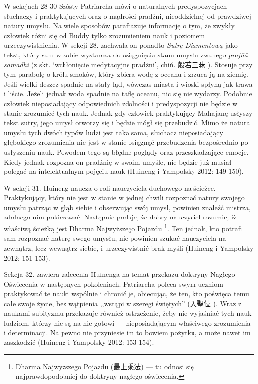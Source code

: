 W sekcjach 28-30 Szósty Patriarcha mówi o naturalnych predyspozycjach słuchaczy i praktykujących oraz o mądrości pradżni, nieoddzielnej od prawdziwej natury umysłu.
Na wiele sposobów parafrazuje informację o tym, że zwykły człowiek różni się od Buddy tylko zrozumieniem nauk i poziomem urzeczywistnienia.
W sekcji 28. zachwala on ponadto \textit{Sutrę Diamentową} jako tekst, który sam w sobie wystarcza do osiągnięcia stanu umysłu zwanego \textit{prajñā samādhi} (z skt. `wchłonięcie medytacyjne pradżni', chiń. 般若三昧 ).
Stosuje przy tym parabolę o królu smoków, który zbiera wodę z oceanu i zrzuca ją na ziemię.
Jeśli wielki deszcz spadnie na stały ląd, wówczas miasta i wioski spłyną jak trawa i liście.
Jeżeli jednak woda spadnie na taflę oceanu, nic się nie wydarzy.
Podobnie człowiek nieposiadający odpowiednich zdolności i predyspozycji nie będzie w stanie zrozumieć tych nauk.
Jednak gdy człowiek praktykujący Mahajanę usłyszy tekst sutry, jego umysł otworzy się i będzie mógł się przebudzić.
Mimo że natura umysłu tych dwóch typów ludzi jest taka sama, słuchacz nieposiadający głębokiego zrozumienia nie jest w stanie osiągnąć przebudzenia bezpośrednio po usłyszeniu nauk.
Powodem tego są błędne poglądy oraz przeszkadzające emocje.
Kiedy jednak rozpozna on pradżnię w swoim umyśle, nie będzie już musiał polegać na intelektualnym pojęciu nauk
(Huineng i Yampolsky 2012: 149-150).

W sekcji 31. Huineng naucza o roli nauczyciela duchowego na ścieżce.
Praktykujący, który nie jest w stanie w jednej chwili rozpoznać natury swojego umysłu patrząc w głąb siebie i obserwując swój umysł, powinien znaleźć mistrza, zdolnego nim pokierować.
Następnie podaje, że dobry nauczyciel rozumie, iż właściwą ścieżką jest Dharma Najwyższego Pojazdu%
\footnote{Dharma Najwyższego Pojazdu (最上乘法) --- tu odnosi się najprawdopodobniej do doktryny nagłego oświecenia.}.%
Ten jednak, kto potrafi sam rozpoznać naturę swego umysłu, nie powinien szukać nauczyciela na zewnątrz, lecz wewnątrz siebie, i urzeczywistnić brak myśli
(Huineng i Yampolsky 2012: 151-153).

Sekcja 32. zawiera zalecenia Huinenga na temat przekazu doktryny Nagłego Oświecenia w następnych pokoleniach.
Patriarcha poleca swym uczniom praktykować te nauki wspólnie i chronić je, obiecując, że ten, kto poświęca temu całe swoje życie, bez wątpienia ,,wstąpi w szeregi świętych'' (入聖位 ).
Wraz z naukami subityzmu przekazuje również ostrzeżenie, żeby nie wyjaśniać tych nauk ludziom, którzy nie są na nie gotowi --- nieposiadającym właściwego zrozumienia i determinacji.
Na pewno nie przyniesie im to bowiem pożytku, a może nawet im zaszkodzić
(Huineng i Yampolsky 2012: 153-154).

